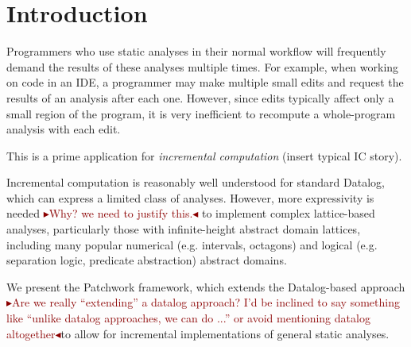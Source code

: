 \documentclass[acmlarge,anonymous]{acmart}\settopmatter{printfolios=true}
\newcommand{\remark}[1]{\textcolor{darkred}{$\blacktriangleright$#1$\blacktriangleleft$}}
\begin{document}




\maketitle


\section{Introduction}

Programmers who use static analyses in their normal workflow will frequently demand the results of these analyses multiple times.
For example, when working on code in an IDE, a programmer may make multiple small edits and request the results of an analysis after each one.
However, since edits typically affect only a small region of the program, it is very inefficient to recompute a whole-program analysis with each edit.

This is a prime application for \textit{incremental computation} (insert typical IC story). 

Incremental computation is reasonably well understood for standard Datalog, which can express a limited class of analyses.\cite{flix, datafun, IncA, ???} However, more expressivity is needed \remark{Why? we need to justify this.} to implement complex lattice-based analyses, particularly those with infinite-height abstract domain lattices, including many popular numerical (e.g. intervals, octagons) and logical (e.g. separation logic, predicate abstraction) abstract domains.

We present the Patchwork framework, which extends the Datalog-based approach \remark{Are we really ``extending'' a datalog approach? I'd be inclined to say something like ``unlike datalog approaches, we can do ...'' or avoid mentioning datalog altogether}to allow for incremental implementations of general static analyses.
\end{document}
